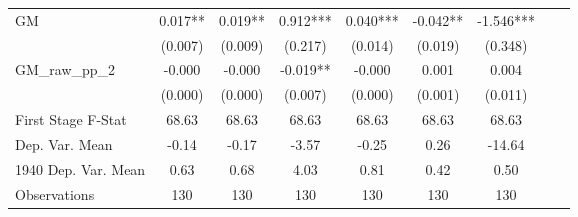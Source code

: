 \begin{tabular}{l*{8}{c}}
GM              &    0.017** &    0.019** &    0.912***&    0.040***&   -0.042** &   -1.546***\\
                &  (0.007)   &  (0.009)   &  (0.217)   &  (0.014)   &  (0.019)   &  (0.348)   \\
\addlinespace
GM\_raw\_pp\_2     &   -0.000   &   -0.000   &   -0.019** &   -0.000   &    0.001   &    0.004   \\
                &  (0.000)   &  (0.000)   &  (0.007)   &  (0.000)   &  (0.001)   &  (0.011)   \\
\midrule
First Stage F-Stat&    68.63   &    68.63   &    68.63   &    68.63   &    68.63   &    68.63   \\
Dep. Var. Mean  &    -0.14   &    -0.17   &    -3.57   &    -0.25   &     0.26   &   -14.64   \\
1940 Dep. Var. Mean&     0.63   &     0.68   &     4.03   &     0.81   &     0.42   &     0.50   \\
Observations    &      130   &      130   &      130   &      130   &      130   &      130   \\
       \bottomrule \end{tabular}

